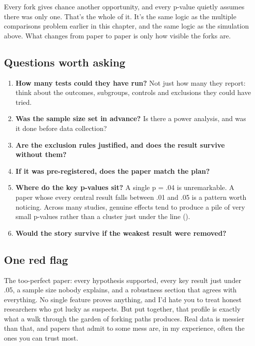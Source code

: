 \documentclass[
]{book}
\providecommand{\tightlist}{%
  \setlength{\itemsep}{0pt}\setlength{\parskip}{0pt}}
\begin{document}
Every fork gives chance another opportunity, and every p-value quietly assumes there was only one. That's the whole of it. It's the same logic as the multiple comparisons problem earlier in this chapter, and the same logic as the simulation above. What changes from paper to paper is only how visible the forks are.

\subsection{Questions worth asking}\label{questions-worth-asking-9}

\begin{enumerate}
\def\labelenumi{\arabic{enumi}.}
\tightlist
\item
  \textbf{How many tests could they have run?} Not just how many they report: think about the outcomes, subgroups, controls and exclusions they could have tried.
\item
  \textbf{Was the sample size set in advance?} Is there a power analysis, and was it done before data collection?
\item
  \textbf{Are the exclusion rules justified, and does the result survive without them?}
\item
  \textbf{If it was pre-registered, does the paper match the plan?}
\item
  \textbf{Where do the key p-values sit?} A single p = .04 is unremarkable. A paper whose every central result falls between .01 and .05 is a pattern worth noticing. Across many studies, genuine effects tend to produce a pile of very small p-values rather than a cluster just under the line ().
\item
  \textbf{Would the story survive if the weakest result were removed?}
\end{enumerate}

\subsection{One red flag}\label{one-red-flag-9}

The too-perfect paper: every hypothesis supported, every key result just under .05, a sample size nobody explains, and a robustness section that agrees with everything. No single feature proves anything, and I'd hate you to treat honest researchers who got lucky as suspects. But put together, that profile is exactly what a walk through the garden of forking paths produces. Real data is messier than that, and papers that admit to some mess are, in my experience, often the ones you can trust most.
\end{document}
